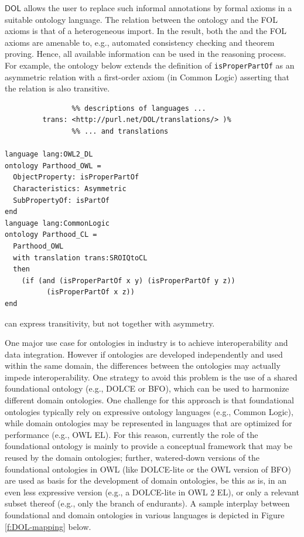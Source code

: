 \documentclass[10pt, a4paper]{isov2}
\newcommand*{\DOL}{\ensuremath{\mathsf{DOL}}\xspace}
\begin{document}
\DOL allows the user to replace such informal annotations by formal axioms in a suitable ontology
language. The relation between the \OWL ontology and the FOL axioms is that of a heterogeneous
import. In the result, both the \OWL and the FOL axioms are amenable to, e.g., automated consistency
checking and theorem proving. Hence, all available information can be used in the reasoning process.
For example, the ontology below extends the \OWL definition of \texttt{isProperPartOf} as an asymmetric relation
with a first-order axiom (in Common Logic) asserting that the relation is also transitive.
\begin{lstlisting}[basicstyle=\small\ttfamily,language=dolText,alsolanguage=clif,alsolanguage=owl2Manchester,escapechar=@,mathescape]
%prefix( lang:  <http://purl.net/DOL/languages/>
                %% descriptions of languages ...
         trans: <http://purl.net/DOL/translations/> )%
                %% ... and translations

language lang:OWL2_DL
ontology Parthood_OWL =
  ObjectProperty: isProperPartOf
  Characteristics: Asymmetric
  SubPropertyOf: isPartOf
end
language lang:CommonLogic
ontology Parthood_CL =
  Parthood_OWL
  with translation trans:SROIQtoCL
  then
    (if (and (isProperPartOf x y) (isProperPartOf y z))
          (isProperPartOf x z))
end
\end{lstlisting}
\OWL can express transitivity, but not together with asymmetry.



\label{onto-2}
One major use case for ontologies in industry is to achieve interoperability and data integration.
However if ontologies are developed independently and used  within the same domain, the
differences between the ontologies may actually impede interoperability. One strategy to avoid this
problem is the use of a shared  foundational ontology (e.g., DOLCE or BFO), which can be used to
harmonize different domain ontologies. One challenge for this approach is that foundational
ontologies typically rely on expressive ontology languages (e.g., Common Logic), while domain
ontologies may be represented in languages that are optimized for performance (e.g., OWL EL). For
this reason, currently the role of the foundational ontology is mainly to provide a conceptual
framework that may be reused by the  domain ontologies; further, watered-down versions of the
foundational ontologies in OWL (like DOLCE-lite or the OWL version of BFO) are used as basis for
the  development of domain ontologies, be this as is, in an even less expressive version (e.g., a
DOLCE-lite in OWL 2 EL), or only a relevant subset thereof (e.g., only the branch of endurants). A
sample interplay between  foundational and domain ontologies in various
languages is depicted in Figure \ref{f:DOL-mapping} below.
\end{document}
